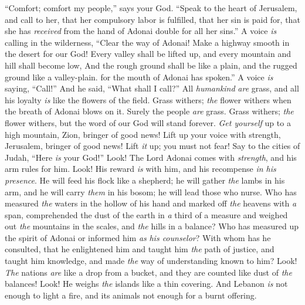 \begin{biblechapter} %
 “Comfort; comfort my people,” says your God.
\verse “Speak to the heart of Jerusalem, and call to her,
\verse that her compulsory labor is fulfilled, that her sin is paid for, 
that she has \textit{received} from the hand of Adonai double for all her sins.”
\verse A voice \textit{is} calling in the wilderness, “Clear the way of Adonai! 
Make a highway smooth in the desert for our God!
\verse Every valley shall be lifted up, 
and every mountain and hill shall become low, 
And the rough ground shall be like a plain, 
and the rugged ground like a valley-plain. for the mouth of Adonai has spoken.”
\verse A voice \textit{is} saying, “Call!” 
And he said, “What shall I call?” 
All \textit{humankind} \textit{are} grass, 
and all his loyalty \textit{is} like the flowers of the field.
\verse Grass withers; \textit{the} flower withers 
when the breath of Adonai blows on it. 
Surely the people \textit{are} grass.
\verse Grass withers; \textit{the} flower withers, 
but the word of our God will stand forever.
\verse \textit{Get yourself} up to a high mountain, Zion, bringer of good news! 
Lift up your voice with strength, Jerusalem, bringer of good news! 
Lift \textit{it} up; you must not fear! 
Say to the cities of Judah, “Here \textit{is} your God!”
\verse Look! The Lord Adonai comes with \textit{strength}, 
and his arm rules for him. 
Look! His reward \textit{is} with him, 
and his recompense \textit{in his presence}.
\verse He will feed his flock like a shepherd; 
he will gather \textit{the} lambs in his arm, 
and he will carry \textit{them} in his bosom; 
he will lead those who nurse.
\verse Who has measured \textit{the} waters in the hollow of his hand 
and marked off \textit{the} heavens with \textit{a} span, 
comprehended the dust of the earth in \textit{a} third of a measure 
and weighed out \textit{the} mountains in the scales, and \textit{the} hills in a balance?
\verse Who has measured up the spirit of Adonai 
or informed him \textit{as} \textit{his counselor}?
\verse With whom has he consulted, that he enlightened him 
and taught him \textit{the} path of justice, 
and taught him knowledge, 
and made \textit{the} way of understanding known to him?
\verse Look! \textit{The} nations \textit{are} like a drop from a bucket, 
and they are counted like dust of \textit{the} balances! 
Look! He weighs \textit{the} islands like a thin covering.
\verse And Lebanon \textit{is} not enough to light a fire, 
and its animals not enough for a burnt offering.

\end{biblechapter}
